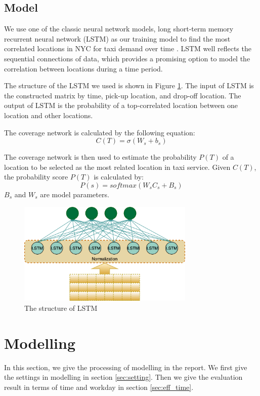 \documentclass[11pt]{article}
\begin{document}
\subsection{Model}
\label{sec:model}
We use one of the classic neural network models, long short-term memory recurrent neural network (LSTM) as our training model to find the most correlated locations in NYC for taxi demand over time \cite{sak2014long}. LSTM well reflects the sequential connections of data, which provides a promising option to model the correlation between locations during a time period.

The structure of the LSTM we used is shown in Figure \ref{Fig:LSTM}. The input of LSTM is the constructed matrix by time, pick-up location, and drop-off location. The output of LSTM is the probability of a top-correlated location between one location and other locations.



The coverage network is calculated by the following equation:
\begin{equation} \label{equ:C(s)}
C(T) =\sigma(W_s + b_s)
\end{equation}

The coverage network is then used to estimate the probability $P(T)$ of a location to be selected as the most related location in taxi service. Given $C(T)$, the probability score $P(T)$ is calculated by:
\begin{equation}
P(s) = softmax(W_sC_s + B_s)
\end{equation}
$B_s$ and $W_s$ are model parameters. 

\begin{figure}[ht]
\includegraphics[width=0.75\textwidth]{plots/LSTM.png}
\centering
\caption{The structure of LSTM}
\label{Fig:LSTM}
\end{figure}


\section{Modelling}
In this section, we give the processing of modelling in the report. We first give the settings in modelling in section \ref{sec:setting}. Then we give the evaluation result in terms of time and workday in section \ref{sec:eff_time}.
\end{document}
